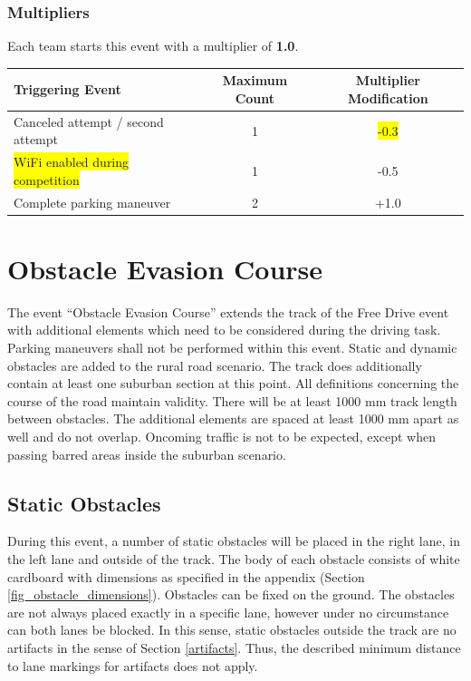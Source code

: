 \documentclass[a4paper]{report}
\begin{document}
{{\subsubsection{Multipliers}
\label{freedrive_multipliers}

Each team starts this event with a multiplier of \textbf{1.0}. 

\begin{table}[H]
\begin{tabular}{@{}lcc@{}}
\toprule
\textbf{Triggering Event}         & \textbf{Maximum Count} & \textbf{Multiplier Modification} \\ \midrule
Canceled attempt / second attempt & 1                      & \colorbox{yellow}{-0.3}                             \\
\colorbox{yellow}{WiFi enabled during competition}   & 1   & -0.5 \\
Complete parking maneuver         & 2                      & +1.0                     
\\
\bottomrule
\end{tabular}
\end{table}

\section{Obstacle Evasion Course}

The event “Obstacle Evasion Course” extends the track of the Free Drive event with additional elements which need to be considered during the driving task. Parking maneuvers shall not be performed within this event. Static and dynamic obstacles are added to the rural road scenario. The track does additionally contain at least one suburban section at this point. All definitions concerning the course of the road maintain validity. There will be at least 1000 mm track length between obstacles. The additional elements are spaced at least 1000 mm apart as well and do not overlap. Oncoming traffic is not to be expected, except when passing barred areas inside the suburban scenario. 

\subsection{Static Obstacles}

During this event, a number of static obstacles will be placed in the right lane, in the left lane and outside of the track. The body of each obstacle consists of white cardboard with dimensions as specified in the appendix (Section \ref{fig_obstacle_dimensions}). Obstacles can be fixed on the ground. The obstacles are not always placed exactly in a specific lane, however under no circumstance can both lanes be blocked. In this sense, static obstacles outside the track are no artifacts in the sense of Section \ref{artifacts}. Thus, the described minimum distance to lane markings for artifacts does not apply. 

}}
\end{document}
